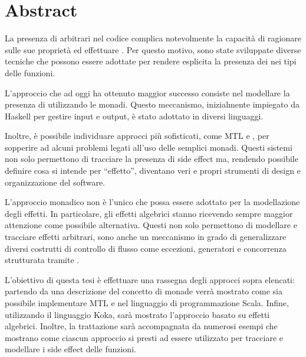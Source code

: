 \chapter*{Abstract}

La presenza di  arbitrari nel codice complica notevolmente la capacità di ragionare sulle sue proprietà ed effettuare .
Per questo motivo, sono state sviluppate diverse tecniche che possono essere adottate per rendere esplicita la presenza dei  nei tipi delle funzioni.

L'approccio che ad oggi ha ottenuto maggior successo consiste nel modellare la presenza di  utilizzando le monadi.
Questo meccanismo, inizialmente impiegato da Haskell per gestire input e output, è stato adottato in diversi linguaggi.

Inoltre, è possibile individuare approcci più sofisticati, come \ac{MTL} e , per sopperire ad alcuni problemi legati all'uso delle semplici monadi.
Questi sistemi non solo permettono di tracciare la presenza di side effect ma, rendendo possibile definire cosa si intende per ``effetto'', diventano veri e propri strumenti di design e organizzazione del software.

L'approccio monadico non è l'unico che possa essere adottato per la modellazione degli effetti. In particolare, gli effetti algebrici stanno ricevendo sempre maggior attenzione come possibile alternativa.
Questi non solo permettono di modellare e tracciare effetti arbitrari, sono anche un meccanismo in grado di generalizzare diversi costrutti di controllo di flusso come eccezioni, generatori e concorrenza strutturata tramite .

L'obiettivo di questa tesi è effettuare una rassegna degli approcci sopra elencati: partendo da una descrizione del concetto di monade verrà mostrato come sia possibile implementare \ac{MTL} e  nel linguaggio di programmazione Scala.
Infine, utilizzando il linguaggio Koka, sarà mostrato l'approccio basato su effetti algebrici. Inoltre, la trattazione sarà accompagnata da numerosi esempi che mostrano come ciascun approccio si presti ad essere utilizzato per tracciare e modellare i side effect delle funzioni.
